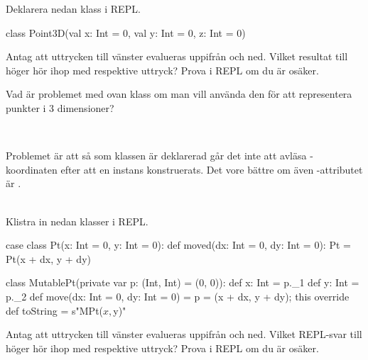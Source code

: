Deklarera nedan klass i REPL.

\begin{Code}
class Point3D(val x: Int = 0, val y: Int = 0, z: Int = 0)
\end{Code}

\Subtask Antag att uttrycken till vänster evalueras uppifrån och ned. Vilket resultat till höger hör ihop med respektive uttryck? Prova i REPL om du är osäker.

\begin{ConceptConnections}

\end{ConceptConnections}

\Subtask Vad är problemet med ovan klass om man vill använda den för att representera punkter i 3 dimensioner?

\SOLUTION

\TaskSolved \what~

\SubtaskSolved

\begin{ConceptConnections}

\end{ConceptConnections}

\SubtaskSolved Problemet är att så som klassen  är deklarerad går det inte att avläsa -koordinaten efter att en instans konstruerats. Det vore bättre om även -attributet är .

\QUESTEND




\QUESTBEGIN

\Task \what~\\Klistra in nedan klasser i REPL.

\begin{Code}
case class Pt(x: Int = 0, y: Int = 0):
  def moved(dx: Int = 0, dy: Int = 0): Pt = Pt(x + dx, y + dy)

class MutablePt(private var p: (Int, Int) = (0, 0)):
  def x: Int = p._1
  def y: Int = p._2
  def move(dx: Int = 0, dy: Int = 0) = { p = (x + dx, y + dy); this }
  override def toString = s"MPt($x,$y)"
\end{Code}

\Subtask
Antag att uttrycken till vänster evalueras uppifrån och ned. Vilket REPL-svar till höger hör ihop med respektive uttryck? Prova i REPL om du är osäker.

